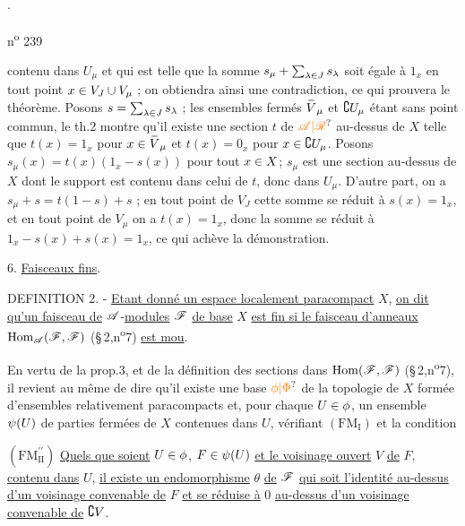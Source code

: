 $\cdot$

n\textsuperscript{o} 239

contenu dans $U_\mu$ et qui est telle que la somme $s_\mu+\sum_{\lambda\in J}s_{\lambda}$ soit égale à $1_x$ en tout point $x\in V_J\cup V_\mu$ ; on obtiendra ainsi une contradiction, ce qui prouvera le théorème. Posons $s=\sum_{\lambda\in J}s_{\lambda}$ ; les ensembles fermés $\overset{\handwritten{\rule{.45em}{.1ex}}}{V}_\mu$ et $\complement U_\mu$ étant sans point commun, le th.2 montre qu'il existe une section $t$ de $\handwritten{\unsure{\mathscr A|\mathscr R}}$ au-dessus de $X$ telle que $t(x)=1_x$ pour $x\handwritten{\in}\overset{\handwritten{\rule{.45em}{.1ex}}}{V}_\mu$ et $t(x)=0_x$ pour $x\in\complement U_\mu$. Posons $s_\mu(x)=t(x)(1_x-s(x))$ pour tout $x\in X$; $s_\mu$ est une section au-dessus de $X$ dont le support est contenu dans celui de $t$, donc dans $U_\mu$. D'autre part, on a $s_\mu+s=t(1-s)+s$ ; en tout point de $V_J$ cette somme se réduit à $s(x)=1_x$, et en tout point de $V_\mu$ on a $t(x)=1_x$, donc la somme se réduit à $1_x-s(x)+s(x)=1_x$, ce qui achève la démonstration.

6. \uline{Faisceaux fins}.

DEFINITION 2. - \uline{Etant donné un espace localement paracompact} $X$, \uline{on dit qu'un faisceau de} $\mathscr A$-\uline{modules} $\mathscr F$ \uline{de base} $X$ \uline{est fin si le faisceau d'anneaux} $\operatorname{Hom}_{\mathscr A}(\mathscr F,\mathscr F)$ (\S\,2,n\textsuperscript{o}7) \uline{est mou}.

En vertu de la prop.3, et de la définition des sections dans $\operatorname{Hom}(\mathscr F,\mathscr F)$ (\S\,2,n\textsuperscript{o}7), il revient au même de dire qu'il existe une base $\handwritten{\unsure{\phi|\Phi}}$ de la topologie de $X$ formée d'ensembles relativement paracompacts et, pour chaque $U\in\phi$, un ensemble $\psi(U)$ de parties fermées de $X$ contenues dans $U$, vérifiant $(\mathrm{FM}_{\mathrm I})$ et la condition

$(\mathrm{FM}^{\prime\prime}_{\mathrm{II}})$ \uline{Quels que soient} $U\in\phi$, $F\in\psi(U)$ \uline{et le voisinage ouvert} $V$ \uline{de} $F$, \uline{contenu dans} $U$, \uline{il existe un endomorphisme} $\theta$ \uline{de} $\mathscr F$ \uline{qui soit l'identité au-dessus d'un voisinage convenable de} $F$ \uline{et se réduise à} $0$ \uline{au-dessus d'un voisinage convenable de} $\complement V$.

